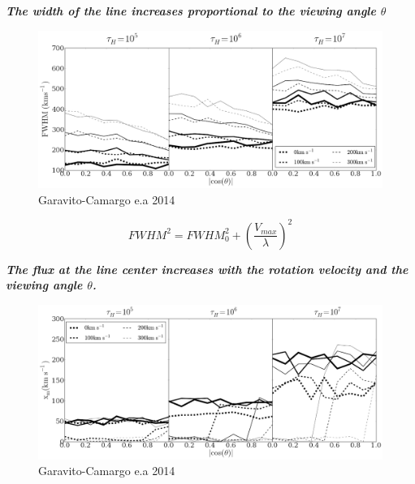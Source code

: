 \documentclass{beamer}
\begin{document}
\begin{frame}{\textit{\textbf{The width of the line increases proportional to the viewing angle $\theta$}}}
\begin{figure}
\includegraphics[scale=0.23]{Figures/f6.png}
\caption*{Garavito-Camargo e.a 2014}
\end{figure}
\[
FWHM^2 = FWHM_0 ^2 + \left (\dfrac{V_{max}}{\lambda}\right ) ^2
\]
\end{frame}

\begin{frame}{\textit{\textbf{The flux at the line center increases with the rotation velocity and the viewing angle $\theta$.}}}
\begin{figure}
\includegraphics[scale=0.23]{Figures/f8.png}
\caption*{Garavito-Camargo e.a 2014}
\end{figure}
\end{frame}
\end{document}
